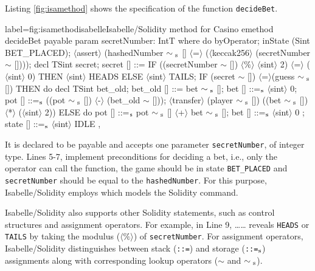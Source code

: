 \documentclass[a4paper,UKenglish,cleveref, autoref, thm-restate]{oasics-v2021}
\begin{document}
Listing \ref{fig:isamethod} shows the specification of the function \texttt{decideBet}.
\begin{code}{label={fig:isamethod}}{isabelle}{Isabelle/Solidity method for Casino}
emethod decideBet payable
  param secretNumber: IntT
where
  do {
    byOperator;
    inState (Sint BET_PLACED);
    $\langle$assert$\rangle$ (hashedNumber $\sim\textsubscript{s}$ [] $\langle$=$\rangle$ ($\langle$keccak256$\rangle$ (secretNumber $\sim$ [])));
    decl TSint secret;
    secret [] ::= IF ((secretNumber $\sim$ []) $\langle\%\rangle$ $\langle$sint$\rangle$ 2) $\langle$=$\rangle$ ($\langle$sint$\rangle$ 0) 
    				        THEN $\langle$sint$\rangle$ HEADS ELSE $\langle$sint$\rangle$ TAILS;
    IF (secret $\sim$ []) $\langle$=$\rangle$(guess $\sim\textsubscript{s}$ []) THEN
    do {
      decl TSint bet_old;
      bet_old [] ::= bet $\sim\textsubscript{s}$ [];
      bet [] ::=$\textsubscript{s}$ $\langle$sint$\rangle$ 0;
      pot [] ::=$\textsubscript{s}$ ((pot $\sim\textsubscript{s}$ []) $\langle$-$\rangle$ (bet_old $\sim$ []));
      $\langle$transfer$\rangle$ (player $\sim\textsubscript{s}$ []) ((bet $\sim\textsubscript{s}$ []) $\langle$*$\rangle$ ($\langle$sint$\rangle$ 2))
    }
    ELSE
    do {
      pot [] ::=$\textsubscript{s}$ pot $\sim\textsubscript{s}$ [] $\langle$+$\rangle$ bet $\sim\textsubscript{s}$ [];
      bet [] ::=$\textsubscript{s}$ $\langle$sint$\rangle$ 0
    };
    state [] ::=$\textsubscript{s}$ $\langle$sint$\rangle$ IDLE
  },
\end{code}
It is declared to be payable and accepts one parameter \texttt{secretNumber}, of integer type.
Lines 5-7, implement preconditions for deciding a bet, i.e., only the operator can call the function, the game should be in state \texttt{BET\_PLACED} and \texttt{secretNumber} should be equal to the \texttt{hashedNumber}. 
For this purpose, Isabelle/Solidity employs \texttt{\color{isarblue}{assert}} which models the Solidity \texttt{\color{blue}{require}} command. 

Isabelle/Solidity also supports other Solidity statements, such as control structures and assignment operators.
For example, in Line 9, \texttt{\color{isarblue}{IF}}\dots \texttt{\color{isarblue}{THEN}}\dots \texttt{\color{isarblue}{ELSE}} reveals \texttt{HEADS} or \texttt{TAILS} by taking the modulus (\texttt{$\langle\%\rangle$}) of \texttt{secretNumber}. 
For assignment operators, Isabelle/Solidity distinguishes between stack (\texttt{::=}) and storage (\texttt{::=}$\textsubscript{s}$) assignments along with corresponding lookup operators ($\sim$ and $\sim\textsubscript{s}$). 
%
\end{document}
